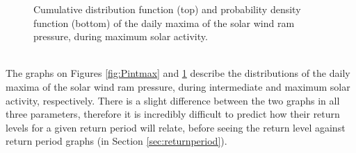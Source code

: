 \documentclass[12pt]{article}
\begin{document}
\begin{figure}[t!]
\begin{minipage}{0.48\textwidth}
                \caption{Cumulative distribution function (top) and probability density function (bottom) of the daily maxima of the solar wind ram pressure, during maximum solar activity.}
                \label{fig:Pmaxmax}
            \end{minipage}
        \end{figure}\\
        The graphs on Figures \ref{fig:Pintmax} and \ref{fig:Pmaxmax} describe the distributions of the daily maxima of the solar wind ram pressure, during intermediate and maximum solar activity, respectively. There is a slight difference between the two graphs in all three parameters, therefore it is incredibly difficult to predict how their return levels for a given return period will relate, before seeing the return level against return period graphs (in Section \ref{sec:returnperiod}).
\end{document}
